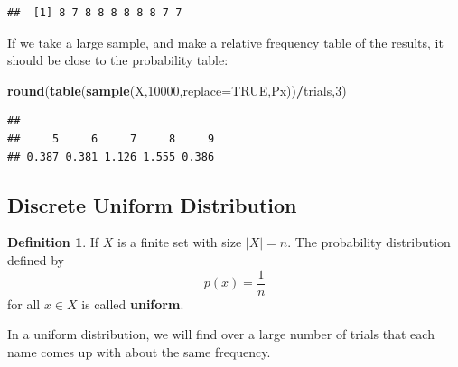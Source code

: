 \documentclass[
]{book}
\newenvironment{Shaded}{\begin{snugshade}}{\end{snugshade}}
\newcommand{\AttributeTok}[1]{\textcolor[rgb]{0.13,0.29,0.53}{#1}}
\newcommand{\ConstantTok}[1]{\textcolor[rgb]{0.56,0.35,0.01}{#1}}
\newcommand{\DecValTok}[1]{\textcolor[rgb]{0.00,0.00,0.81}{#1}}
\newcommand{\FunctionTok}[1]{\textcolor[rgb]{0.13,0.29,0.53}{\textbf{#1}}}
\newcommand{\NormalTok}[1]{#1}
\newcommand{\SpecialCharTok}[1]{\textcolor[rgb]{0.81,0.36,0.00}{\textbf{#1}}}
\theoremstyle{definition}
\newtheorem{definition}{Definition}[chapter]
\theoremstyle{definition}
\theoremstyle{definition}
\theoremstyle{definition}
\theoremstyle{remark}
\begin{document}
\begin{verbatim}
##  [1] 8 7 8 8 8 8 8 8 7 7
\end{verbatim}

If we take a large sample, and make a relative frequency table of the results, it should be close to the probability table:

\begin{Shaded}
\begin{Highlighting}[]
\FunctionTok{round}\NormalTok{(}\FunctionTok{table}\NormalTok{(}\FunctionTok{sample}\NormalTok{(X,}\DecValTok{10000}\NormalTok{,}\AttributeTok{replace=}\ConstantTok{TRUE}\NormalTok{,Px))}\SpecialCharTok{/}\NormalTok{trials,}\DecValTok{3}\NormalTok{)}
\end{Highlighting}
\end{Shaded}

\begin{verbatim}
## 
##     5     6     7     8     9 
## 0.387 0.381 1.126 1.555 0.386
\end{verbatim}

\subsection{Discrete Uniform Distribution}\label{discrete-uniform-distribution}

\begin{definition}
\protect\hypertarget{def:discrete-uniform}{}\label{def:discrete-uniform}If \(X\) is a finite set with size \(|X| = n\). The probability distribution defined by \[p(x) = \frac{1}{n}\] for all \(x \in X\) is called \textbf{uniform}.
\end{definition}

In a uniform distribution, we will find over a large number of trials that each name comes up with about the same frequency.
\end{document}
